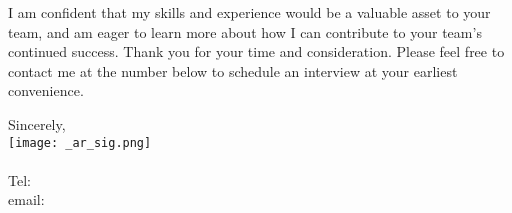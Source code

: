 \documentclass[letterpaper]{article}
\begin{document}
I am confident that my skills and experience would be a valuable asset to your team, and
am eager to learn more about how I can contribute to your team's continued success.
Thank you for your time and consideration.
Please feel free to contact me at the number below to schedule an interview at your earliest convenience.

Sincerely,\\
    \hspace{1em}
    \texttt{[image: \_ar\_sig.png]} \\
    \CVsigname \\
    \small
    Tel: \CVphone \\
    email: \CVemail
\end{document}
